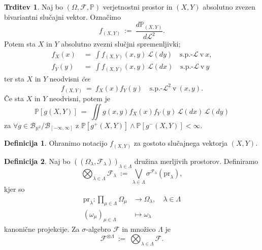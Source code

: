 \documentclass[11pt]{article}
\newcommand{\R}{\mathbb{R}}
\renewcommand{\P}{\mathbb{P}}
\newcommand{\B}{\mathcal{B}}
\newcommand{\F}{\mathcal{F}}
\newcommand{\LL}{\mathscr{L}}
\newcommand{\oklepaj}[1]{\left(#1\right)}
\newcommand{\1}{\mathbbm{1}}
\newcommand{\rr}{[-\infty,\infty]}
\newcommand{\pr}{\text{pr}}
\theoremstyle{definition}
\newtheorem{definicija}{Definicija}[section]
\theoremstyle{definition}
\newtheorem{trditev}{Trditev}[section]
\theoremstyle{definition}
\theoremstyle{definition}
\begin{document}
\begin{trditev}

Naj bo $(\Omega, \F, \P)$ verjetnostni prostor in $(X,Y)$ absolutno zvezen bivariantni slučajni vektor. Označimo
$$f_{(X,Y)} ~:=~ \frac{d\P_{(X,Y)}}{d\LL^2}.$$
Potem sta $X$ in $Y$ absolutno zvezni slučjni spremenljivki;
\begin{align*}
f_X(x) ~&=~ \int f_{(X,Y)}(x,y)\,\LL(dy) \quad \text{s.p.-}\LL ~\text{v}~x, \\
f_Y(y) ~&=~ \int f_{(X,Y)}(x,y)\,\LL(dx) \quad \text{s.p.-}\LL ~\text{v}~y
\end{align*}
ter sta $X$ in $Y$ neodvisni \textit{čee}
$$f_{(X,Y)} ~=~ f_X(x)f_Y(y) \quad \text{s.p.-}\LL^2 ~\text{v}~ (x,y).$$
Če sta $X$ in $Y$ neodvisni, potem je
$$\P[g(X,Y)] ~=~ \iint g(x,y) f_X(x) f_Y(y) \,\LL(dx)\,\LL(dy)$$
za $\forall g \in \B_{\R^2}/\B_{\rr}$ z $\P[g^+(X,Y)] \wedge \P[g^-(X,Y)] < \infty$.

\end{trditev}
\vspace{0.5cm}

\begin{definicija}

Ohranimo notacijo $f_{(X,Y)}$ za gostoto slučajnega vektorja $(X,Y)$.

\end{definicija}
\vspace{0.5cm}

\begin{definicija}

Naj bo $\oklepaj{(\Omega_\lambda, \F_\lambda)}_{\lambda\in\Lambda}$ družina merljivih prostorov. Definiramo
$$\bigotimes_{\lambda\in\Lambda} \F_\lambda ~:=~ \bigvee_{\lambda \in \Lambda} \sigma^{\F_\lambda}(\pr_\lambda),$$
kjer so 
\begin{align*}
\pr_\lambda: \prod_{\mu \in \Lambda} \Omega_\mu &\rightarrow \Omega_\lambda, \quad \lambda \in \Lambda \\
(\omega_\mu)_{\mu \in \Lambda} &\mapsto \omega_\lambda
\end{align*}
kanonične projekcije. Za $\sigma$-algebro $\F$ in množico $\Lambda$ je 
$$\F^{\otimes\Lambda} ~:=~ \bigotimes_{\lambda\in\Lambda} \F.$$

\end{definicija}
\vspace{0.5cm}
\end{document}
